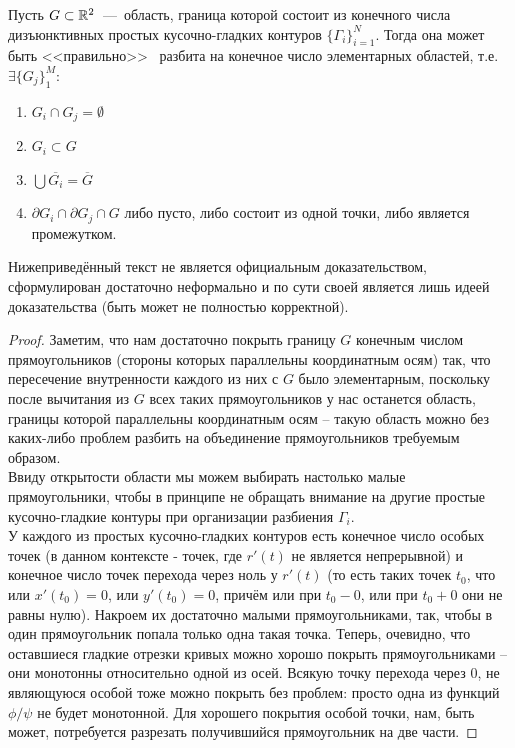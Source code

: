 \hypertarget{lemma_8_6}{}
\begin{lemma}[о разбиении б/д]
    Пусть $G \subset \mathbb{R}^2$~---~область, граница которой состоит из конечного числа дизъюнктивных простых кусочно-гладких контуров $\{\Gamma_i\}_{i = 1}^N$. Тогда она может быть <<правильно>> \  разбита на конечное число элементарных областей, т.е. $\exists \{G_j\}_1^M$:
    \begin{enumerate}
        \item $G_i \cap G_j = \emptyset$
        \item $G_i \subset G$
        \item $\bigcup \overline{G_i} = \overline{G}$
        \item $\partial G_i \cap \partial G_j \cap G$ либо пусто, либо состоит из одной точки, либо является промежутком.
    \end{enumerate}
\end{lemma}
\begin{note}
    Нижеприведённый текст не является официальным доказательством, сформулирован достаточно неформально и по сути своей является лишь идеей доказательства (быть может не полностью корректной).
\end{note}
\begin{proof}
    Заметим, что нам достаточно покрыть границу $G$ конечным числом прямоугольников (стороны которых параллельны координатным осям) так, что пересечение внутренности каждого из них с $G$ было элементарным, поскольку после вычитания из $G$ всех таких прямоугольников у нас останется область, границы которой параллельны координатным осям -- такую область можно без каких-либо проблем разбить на объединение прямоугольников требуемым образом. \\
    Ввиду открытости области мы можем выбирать настолько малые прямоугольники, чтобы в принципе не обращать внимание на другие простые кусочно-гладкие контуры при организации разбиения $\Gamma_i$. \\
    У каждого из простых кусочно-гладких контуров есть конечное число особых точек (в данном контексте - точек, где $r'(t)$ не является непрерывной) и конечное число точек перехода через ноль у $r'(t)$ (то есть таких точек $t_0$, что или $x'(t_0) = 0$, или $y'(t_0) = 0$, причём или при $t_0 - 0$, или при $t_0 + 0$ они не равны нулю). Накроем их достаточно малыми прямоугольниками, так, чтобы в один прямоугольник попала только одна такая точка. Теперь, очевидно, что оставшиеся гладкие отрезки кривых можно хорошо покрыть прямоугольниками -- они монотонны относительно одной из осей. Всякую точку перехода через 0, не являющуюся особой тоже можно покрыть без проблем: просто одна из функций $\phi/\psi$ не будет монотонной. Для хорошего покрытия особой точки, нам, быть может, потребуется разрезать получившийся прямоугольник на две части.
\end{proof}






